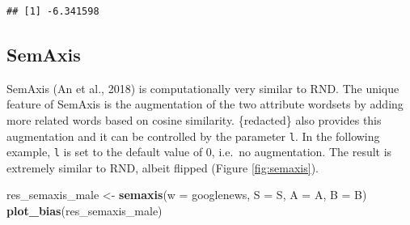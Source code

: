 \documentclass[english,man,mask]{apa6}
\newenvironment{Shaded}{\begin{snugshade}}{\end{snugshade}}
\newcommand{\DataTypeTok}[1]{\textcolor[rgb]{0.13,0.29,0.53}{#1}}
\newcommand{\KeywordTok}[1]{\textcolor[rgb]{0.13,0.29,0.53}{\textbf{#1}}}
\newcommand{\NormalTok}[1]{#1}
\newcommand{\StringTok}[1]{\textcolor[rgb]{0.31,0.60,0.02}{#1}}
\begin{document}
\begin{verbatim}
## [1] -6.341598
\end{verbatim}

\hypertarget{semaxis}{%
\subsection{SemAxis}\label{semaxis}}

SemAxis (An et al., 2018) is computationally very similar to RND. The unique feature of SemAxis is the augmentation of the two attribute wordsets by adding more related words based on cosine similarity. \{redacted\} also provides this augmentation and it can be controlled by the parameter \texttt{l}. In the following example, \texttt{l} is set to the default value of 0, i.e.~no augmentation. The result is extremely similar to RND, albeit flipped (Figure \ref{fig:semaxis}).

\begin{Shaded}
\begin{Highlighting}[]
\NormalTok{res_semaxis_male <-}\StringTok{ }\KeywordTok{semaxis}\NormalTok{(}\DataTypeTok{w =}\NormalTok{ googlenews, }\DataTypeTok{S =}\NormalTok{ S, }\DataTypeTok{A =}\NormalTok{ A, }\DataTypeTok{B =}\NormalTok{ B)}
\KeywordTok{plot_bias}\NormalTok{(res_semaxis_male)}
\end{Highlighting}
\end{Shaded}
\end{document}
